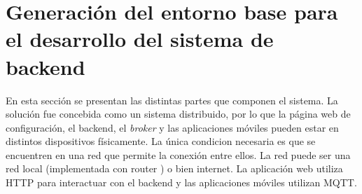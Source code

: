 \section{Generación del entorno base para el desarrollo del sistema de backend}
\label{Generación del entorno base para el desarrollo del sistema de backend}
 En esta sección se presentan las distintas partes que componen el sistema.
La solución fue concebida como un sistema distribuido, por lo que la página web de configuración, el backend, el \textit{broker} y las aplicaciones móviles pueden estar en distintos dispositivos físicamente. La única condicion necesaria es que se encuentren en una red que permite la conexión entre ellos. La red puede ser una red local (implementada con router ) o bien internet.
La aplicación web utiliza HTTP para interactuar con el backend y las aplicaciones móviles utilizan MQTT.








	
		

